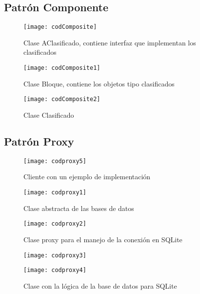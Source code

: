 \subsection{Patrón Componente}
\begin{figure}[H]
	
	\texttt{[image: codComposite]}
	
	\caption{Clase AClasificado, contiene interfaz que implementan los clasificados}
	\label{fig:codSingleton2}
\end{figure}
\clearpage
\begin{figure}[H]
	\centering
	\texttt{[image: codComposite1]}
	\centering
	\caption{Clase Bloque, contiene los objetos tipo clasificados}
	\label{fig:codSingleton2}
\end{figure}
\begin{figure}[H]
	\centering
	\texttt{[image: codComposite2]}
	\centering
	\caption{Clase Clasificado}
	\label{fig:codSingleton2}
\end{figure}
\subsection{Patrón Proxy}
\begin{figure}[H]
	\centering
	\texttt{[image: codproxy5]}
	\centering
	\caption{Cliente con un ejemplo de implementación}
	\label{fig:codproxy5}
\end{figure}

\begin{figure}[H]

	\texttt{[image: codproxy1]}

	\caption{Clase abstracta de las bases de datos}
	\label{fig:codproxy1}
\end{figure}

\clearpage
\begin{figure}[H]
	\centering
	\texttt{[image: codproxy2]}
	\centering
	\caption{Clase proxy para el manejo de la conexión en SQLite}
	\label{fig:codproxy2}
\end{figure}
\begin{figure}[H]
	\centering
	\texttt{[image: codproxy3]}
	\centering
	\label{fig:codproxy3}
\end{figure}
\begin{figure}[H]

	\texttt{[image: codproxy4]}
	\caption{Clase con la lógica de la base de datos para SQLite}

\end{figure}

